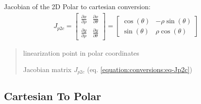 \documentclass[letterpaper,10pt,english]{sphinxmanual}
\begin{document}
\begin{fulllineitems}
\label{\detokenize{conversions:conversions.J_p2c}}
\pysigstartsignatures
{}
\pysigstopsignatures
\sphinxAtStartPar
Jacobian of the 2D Polar to cartesian conversion:
\begin{equation}\label{equation:conversions:eq-Jp2c}
\begin{split}J_{p2c} = \begin{bmatrix} \frac{\partial x}{\partial \rho} & \frac{\partial x}{\partial \theta} \\ \frac{\partial y}{\partial \rho} & \frac{\partial y}{\partial \theta} \end{bmatrix} = \begin{bmatrix} \cos(\theta) & -\rho \sin(\theta) \\ \sin(\theta) & \rho \cos(\theta) \end{bmatrix}\end{split}
\end{equation}\begin{quote}\begin{description}
\sphinxAtStartPar
{} \textendash{} linearization point in polar coordinates

\sphinxAtStartPar
Jacobian matrix \(J_{p2c}\) (eq. \eqref{equation:conversions:eq-Jp2c})

\end{description}\end{quote}

\end{fulllineitems}



\subsection{Cartesian To Polar}
\label{\detokenize{conversions:cartesian-to-polar}}
\end{document}
